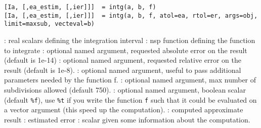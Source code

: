 
\begin{mandesc}
\end{mandesc}

\begin{calling_sequence}
\begin{verbatim}
[Ia, [,ea_estim, [,ier]]]  = intg(a, b, f)
[Ia, [,ea_estim, [,ier]]]  = intg(a, b, f, atol=ea, rtol=er, args=obj, limit=maxsub, vecteval=b)
\end{verbatim}
\end{calling_sequence}
\begin{parameters}
  \begin{varlist}
    :  real scalars defining the integration interval
    : nsp function defining the function to integrate
    : optional named argument, requested absolute error
                      on the result (default is 1e-14)
    : optional named argument, requested relative error
                      on the result (default is 1e-8).
    : optional named argument, useful to pass
    additional parameters needed by the function f.
    : optional named argument, max number of
    subdivisions allowed (default 750).
    : optional named argument, boolean scalar
    (default \verb+%f+), use \verb+%t+ if you write the function
                   \verb+f+ such that it could be evaluated on a
                   vector argument (this speed up the computation).
    : computed approximate result
    : estimated error
    : scalar given some information about the computation.
  \end{varlist}
\end{parameters}

